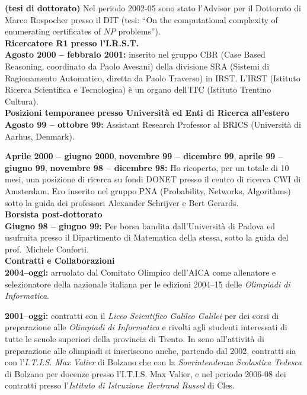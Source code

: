 \documentclass[10pt]{article}
\newcommand{\subvoice}[1] { {\large \bf #1} \smallskip\\ }
\begin{document}
{\bf (tesi di dottorato)} Nel periodo 2002-05 sono stato l'Advisor per il Dottorato di Marco
Rospocher presso il DIT (tesi: ``On the computational complexity
of enumerating certificates of $NP$ problems'').\\


\subvoice{Ricercatore R1 presso l'I.R.S.T.}
{\bf Agosto 2000 -- febbraio 2001:}
inserito nel gruppo CBR (Case Based Reasoning, coordinato da Paolo Avesani)
della divisione SRA
(Sistemi di Ragionamento Automatico, diretta da Paolo Traverso) in IRST.
L'IRST (Istituto Ricerca Scientifica e Tecnologica)
\`e un organo dell'ITC (Istituto Trentino Cultura).\\

\subvoice{Posizioni temporanee presso Universit\`a ed Enti di Ricerca all'estero}
{\bf Agosto 99 -- ottobre 99:}
     Assistant Research Professor
     al  BRICS (Universit\`a di Aarhus, Denmark). 

\noindent
{\bf Aprile 2000 -- giugno 2000},
{\bf novembre 99 -- dicembre 99},
{\bf aprile 99 -- giugno 99},
{\bf novembre 98 -- dicembre 98:}
      Ho ricoperto, per un totale di 10 mesi,
      una posizione di ricerca su fondi DONET
      presso il centro di ricerca CWI di Amsterdam.
      Ero inserito nel gruppo PNA (Probability, Networks, Algorithms)
      sotto la guida dei professori Alexander Schrijver
      e Bert Gerards.\\

\subvoice{Borsista post-dottorato}
{\bf Giugno 98 -- giugno 99:}
Per borsa
bandita dall'Universit\`a di Padova
ed usufruita
presso il Dipartimento di Matematica 
della stessa,
sotto la guida del prof.~Michele Conforti.\\


\subvoice{Contratti e Collaborazioni}
{\bf 2004--oggi:} arruolato dal Comitato Olimpico dell'AICA
come allenatore e selezionatore
della nazionale italiana per le edizioni 2004--15
delle {\em Olimpiadi di Informatica}.

\noindent
{\bf 2001--oggi:}
contratti con il {\em Liceo Scientifico Galileo Galilei}
per dei corsi di preparazione alle {\em Olimpiadi di Informatica}
e rivolti agli studenti interessati
di tutte le scuole superiori della provincia di Trento.
In seno all'attivit\`a di preparazione alle olimpiadi
si inseriscono anche,
partendo dal 2002, contratti
sia con l'{\em I.T.I.S.
Max Valier} di Bolzano che
con la {\em Sovrintendenza Scolastica Tedesca} di Bolzano
per docenze presso l'I.T.I.S.
Max Valier,
e nel periodo 2006-08 dei contratti presso
l'{\em Istituto di Istruzione Bertrand Russel} di Cles.
%
\end{document}
